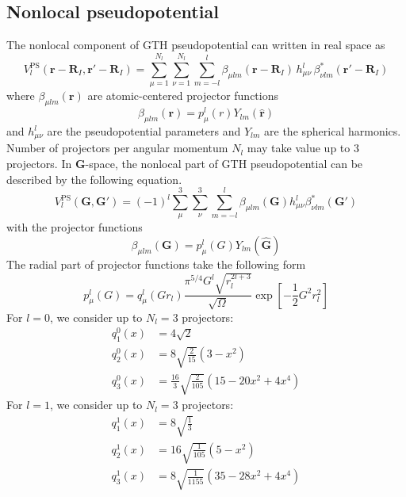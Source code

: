 \subsection{Nonlocal pseudopotential}

The nonlocal component of GTH pseudopotential can written in real space as
\begin{equation}
V^{\mathrm{PS}}_{l}(\mathbf{r}-\mathbf{R}_{I},\mathbf{r}'-\mathbf{R}_{I}) =
\sum_{\mu=1}^{N_{l}} \sum_{\nu=1}^{N_{l}} \sum_{m=-l}^{l}
\beta_{\mu lm}(\mathbf{r}-\mathbf{R}_{I})\,
h^{l}_{\mu\nu}\,
\beta^{*}_{\nu lm}(\mathbf{r}'-\mathbf{R}_{I})
\end{equation}
where $\beta_{\mu lm}(\mathbf{r})$ are atomic-centered projector functions
\begin{equation}
\beta_{\mu lm}(\mathbf{r}) =
p^{l}_{\mu}(r) Y_{lm}(\hat{\mathbf{r}})
\label{eq:proj_NL_R}
\end{equation}
%
and $h^{l}_{\mu\nu}$ are the pseudopotential parameters and
$Y_{lm}$ are the spherical harmonics. Number of projectors per angular
momentum $N_{l}$ may take value up to 3 projectors.
%
In $\mathbf{G}$-space, the nonlocal part of GTH pseudopotential can be described by
the following equation.
\begin{equation}
V^{\mathrm{PS}}_{l}(\mathbf{G},\mathbf{G}') =
(-1)^{l} \sum_{\mu}^{3} \sum_{\nu}^{3}\sum_{m=-l}^{l}
\beta_{\mu l m}(\mathbf{G}) h^{l}_{\mu\nu}
\beta^{*}_{\nu l m}(\mathbf{G}')
\end{equation}
with the projector functions
\begin{equation}
\beta_{\mu lm}(\mathbf{G}) = p^{l}_{\mu}(G) Y_{lm}(\hat{\mathbf{G}})
\label{eq:betaNL_G}
\end{equation}
The radial part of projector functions take the following form
\begin{equation}
p^{l}_{\mu}(G) = q^{l}_{\mu}\left(Gr_{l}\right)
\frac{\pi^{5/4}G^{l}\sqrt{ r_{l}^{2l+3}}}{\sqrt{\Omega}}
\exp\left[-\frac{1}{2}G^{2}r^{2}_{l}\right]
\label{eq:proj_NL_G}
\end{equation}
%
For $l=0$, we consider up to $N_{l}=3$ projectors:
\begin{align}
q^{0}_{1}(x) & = 4\sqrt{2} \\
q^{0}_{2}(x) & = 8\sqrt{\frac{2}{15}}(3 - x^2) \\
q^{0}_{3}(x) & = \frac{16}{3}\sqrt{\frac{2}{105}} (15 - 20x^2 + 4x^4)
\end{align}
%
For $l=1$, we consider up to $N_{l}=3$ projectors:
\begin{align}
q^{1}_{1}(x) & = 8 \sqrt{\frac{1}{3}} \\
q^{1}_{2}(x) & = 16 \sqrt{\frac{1}{105}} (5 - x^2) \\
q^{1}_{3}(x) & = 8 \sqrt{\frac{1}{1155}} (35 - 28x^2 + 4x^4)
\end{align}
